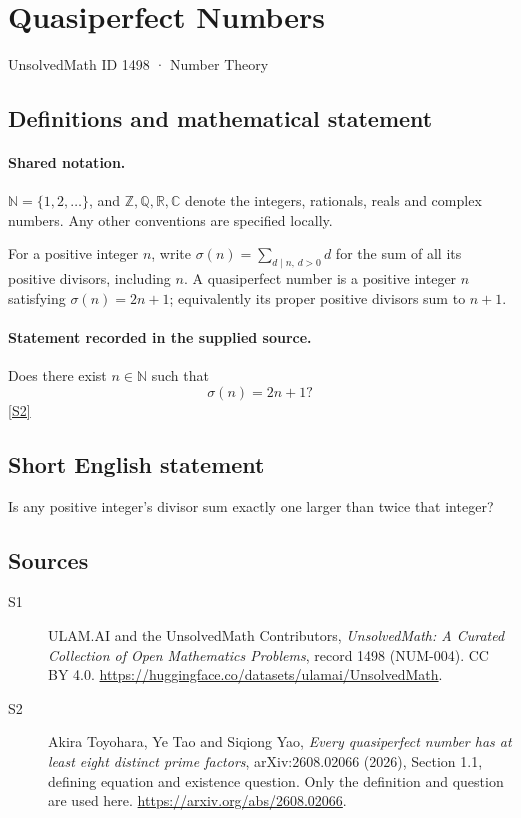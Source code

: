 \documentclass[11pt]{article}
\newcommand{\sref}[2]{\hyperlink{source:#1:#2}{[S#2]}}
\begin{document}
\setcounter{section}{1497}
\section{Quasiperfect Numbers}\label{1498}
{\small\sffamily UnsolvedMath ID 1498 · Number Theory}
\subsection{Definitions and mathematical statement}

\paragraph{Shared notation.}$\mathbb N=\{1,2,\ldots\}$, and $\mathbb Z,\mathbb Q,\mathbb R,\mathbb C$ denote the integers, rationals, reals and complex numbers. Any other conventions are specified locally.


For a positive integer \(n\), write
\(\sigma(n)=\sum_{d\mid n,\,d>0}d\) for the sum of all its positive
divisors, including \(n\). A quasiperfect number is a positive integer
\(n\) satisfying \(\sigma(n)=2n+1\); equivalently its proper positive
divisors sum to \(n+1\).
\paragraph{Statement recorded in the supplied source.}
Does there exist \(n\in\mathbb N\) such that
\[
                             \sigma(n)=2n+1?
\] \sref{1498}{2}
\subsection{Short English statement}
Is any positive integer's divisor sum exactly one larger than twice that integer?
\subsection{Sources}
\begin{description}
\item[\hypertarget{source:1498:1}{S1}] ULAM.AI and the UnsolvedMath Contributors, \emph{UnsolvedMath: A Curated Collection of Open Mathematics Problems}, record 1498 (NUM-004). CC BY 4.0. \url{https://huggingface.co/datasets/ulamai/UnsolvedMath}.
\item[\hypertarget{source:1498:2}{S2}] Akira Toyohara, Ye Tao and Siqiong Yao, \emph{Every quasiperfect number has at least eight distinct prime factors}, arXiv:2608.02066 (2026), Section 1.1, defining equation and existence question. Only the definition and question are used here. \url{https://arxiv.org/abs/2608.02066}.
\end{description}
\label{end:1498}
\end{document}
